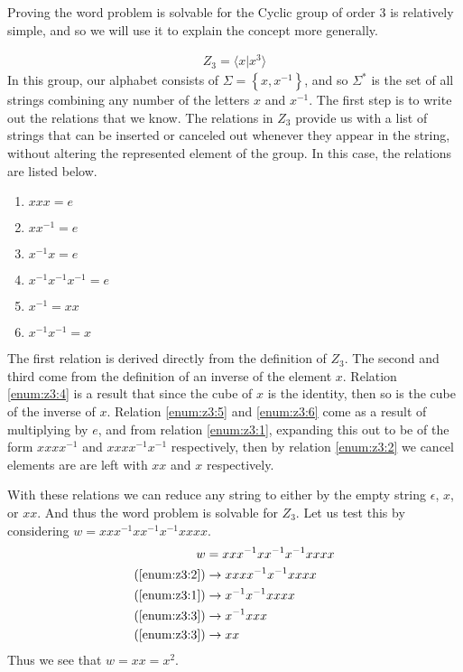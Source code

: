 \documentclass[10pt]{amsart}
\theoremstyle{definition}
\begin{document}
Proving the word problem is solvable for the Cyclic group of order 3 is
relatively simple, and so we will use it to explain the concept more generally.

\begin{align}
  Z_3=\langle x \vert x^3 \rangle
\end{align}
In this group, our alphabet consists of $\Sigma=\left\{x,x^{-1}\right\}$, and
so $\Sigma^*$ is the set of all strings combining any number of the letters $x$
and $x^{-1}$. The first step is to write out the relations that we know. The
relations in $Z_3$ provide us with a list of strings that can be inserted or
canceled out whenever they appear in the string, without altering the
represented element of the group. In this case, the relations are listed below.
\begin{multicols}{2}
  \begin{enumerate}
    \item $xxx= e$\label{enum:z3:1}
    \item $xx^{-1}= e$\label{enum:z3:2}
    \item $x^{-1}x= e$\label{enum:z3:3}
    \item $x^{-1}x^{-1}x^{-1}= e$\label{enum:z3:4}
    \item $x^{-1}= xx$\label{enum:z3:5}
    \item $x^{-1}x^{-1}= x$\label{enum:z3:6}
  \end{enumerate}
\end{multicols}
The first relation is derived directly from the definition of $Z_3$. The second
and third come from the definition of an inverse of the element $x$. Relation
\ref{enum:z3:4} is a result that since the cube of $x$ is the identity, then so
is the cube of the inverse of $x$. Relation \ref{enum:z3:5} and \ref{enum:z3:6}
come as a result of multiplying by $e$, and from relation \ref{enum:z3:1},
expanding this out to be of the form $xxxx^{-1}$ and $xxxx^{-1}x^{-1}$
respectively, then by relation \ref{enum:z3:2} we cancel elements are are left
with $xx$ and $x$ respectively.

With these relations we can reduce any string to either by the empty string
$\epsilon$, $x$, or $xx$. And thus the word problem is solvable for $Z_3$. Let
us test this by considering $w=xxx^{-1}xx^{-1}x^{-1}xxxx$.
\begin{align*}
  w&=xxx^{-1}xx^{-1}x^{-1}xxxx\\
  (\ref{enum:z3:2})&\rightarrow xxxx^{-1}x^{-1}xxxx\\
  (\ref{enum:z3:1})&\rightarrow x^{-1}x^{-1}xxxx\\
  (\ref{enum:z3:3})&\rightarrow x^{-1}xxx\\
  (\ref{enum:z3:3})&\rightarrow xx\\
\end{align*}
Thus we see that $w=xx=x^2$.
\end{document}
